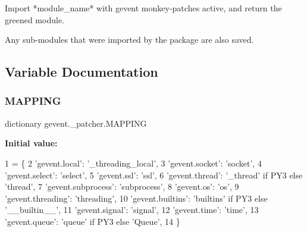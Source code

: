 \begin{DoxyVerb}Import *module_name* with gevent monkey-patches active,
and return the greened module.

Any sub-modules that were imported by the package are also
saved.\end{DoxyVerb}
 

\subsection{Variable Documentation}
\mbox{\label{namespacegevent_1_1__patcher_ab66571021c8a310fda9de5b9e4a2d204}} 
\subsubsection{\texorpdfstring{M\+A\+P\+P\+I\+NG}{MAPPING}}
{\footnotesize\ttfamily dictionary gevent.\+\_\+patcher.\+M\+A\+P\+P\+I\+NG}

{\bfseries Initial value\+:}
\begin{DoxyCode}
1 =  \{
2     \textcolor{stringliteral}{'gevent.local'}: \textcolor{stringliteral}{'\_threading\_local'},
3     \textcolor{stringliteral}{'gevent.socket'}: \textcolor{stringliteral}{'socket'},
4     \textcolor{stringliteral}{'gevent.select'}: \textcolor{stringliteral}{'select'},
5     \textcolor{stringliteral}{'gevent.ssl'}: \textcolor{stringliteral}{'ssl'},
6     \textcolor{stringliteral}{'gevent.thread'}: \textcolor{stringliteral}{'\_thread'} \textcolor{keywordflow}{if} PY3 \textcolor{keywordflow}{else} \textcolor{stringliteral}{'thread'},
7     \textcolor{stringliteral}{'gevent.subprocess'}: \textcolor{stringliteral}{'subprocess'},
8     \textcolor{stringliteral}{'gevent.os'}: \textcolor{stringliteral}{'os'},
9     \textcolor{stringliteral}{'gevent.threading'}: \textcolor{stringliteral}{'threading'},
10     \textcolor{stringliteral}{'gevent.builtins'}: \textcolor{stringliteral}{'builtins'} \textcolor{keywordflow}{if} PY3 \textcolor{keywordflow}{else} \textcolor{stringliteral}{'\_\_builtin\_\_'},
11     \textcolor{stringliteral}{'gevent.signal'}: \textcolor{stringliteral}{'signal'},
12     \textcolor{stringliteral}{'gevent.time'}: \textcolor{stringliteral}{'time'},
13     \textcolor{stringliteral}{'gevent.queue'}: \textcolor{stringliteral}{'queue'} \textcolor{keywordflow}{if} PY3 \textcolor{keywordflow}{else} \textcolor{stringliteral}{'Queue'},
14 \}
\end{DoxyCode}
